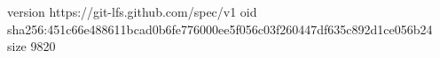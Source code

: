 version https://git-lfs.github.com/spec/v1
oid sha256:451c66e488611bcad0b6fe776000ee5f056c03f260447df635c892d1ce056b24
size 9820
